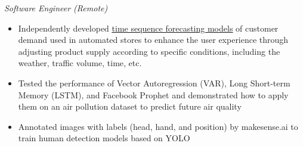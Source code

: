 \textit{Software Engineer (Remote)}\par
\begin{itemize}
  \item Independently developed \href{https://github.com/ttezy/Time-Sequence-Analysis}{\uline{time sequence forecasting models}} of customer demand used in automated stores to enhance the user experience through adjusting product supply according to specific conditions, including the weather, traffic volume, time, etc.
  \item Tested the performance of Vector Autoregression (VAR), Long Short-term Memory (LSTM), and Facebook Prophet and demonstrated how to apply them on an air pollution dataset to predict future air quality
  \item Annotated images with labels (head, hand, and position) by makesense.ai to train human detection models based on YOLO
\end{itemize}
